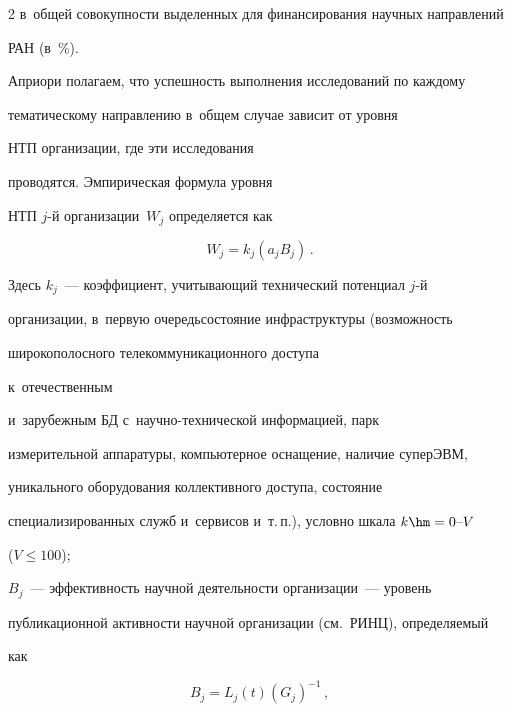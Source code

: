 \begin{multicols}{2}
в~общей совокупности выделенных для финансирования научных на\-прав\-ле\-ний 

РАН (в~\%). 

    

    Априори полагаем, что успешность выполнения исследований по каждому 

тематическому на\-прав\-ле\-нию в~общем случае зависит от уровня  

НТП организации, где эти исследования 

проводятся. Эмпирическая формула уровня 

НТП $j$-й организации~$W_j$ определяется как

    \begin{equation}

    W_j=k_j\left(a_j B_j\right)\,.

    \label{e3-sun}

    \end{equation}

Здесь $k_j$~--- коэффициент, учи\-ты\-ва\-ющий технический потенциал $j$-й 

организации, в~первую очередь\linebreak со\-сто\-яние инфраструктуры (возможность 

ши\-ро\-кополосного телекоммуникационного доступа\linebreak

 к~отечественным 

и~зарубежным БД с~на\-уч\-но-тех\-ни\-че\-ской информацией, парк 

измерительной аппаратуры, компьютерное оснащение, наличие супер\-ЭВМ, 

уникального оборудования коллективного доступа, состояние 

специализированных служб и~сервисов и~т.\,п.), условно шкала $k\hm= 0\mbox{--}V$ 

($V\leq 100$);

$B_j$~--- эффективность научной деятельности организации~--- уровень 

пуб\-ли\-ка\-ци\-он\-ной активности научной организации (см.\ РИНЦ), опре\-де\-ля\-емый 

как



\noindent

\begin{equation}

B_j=L_j(t)\left( G_j\right)^{-1}\,,

\label{e4-sun}


\end{equation}
\end{multicols}
